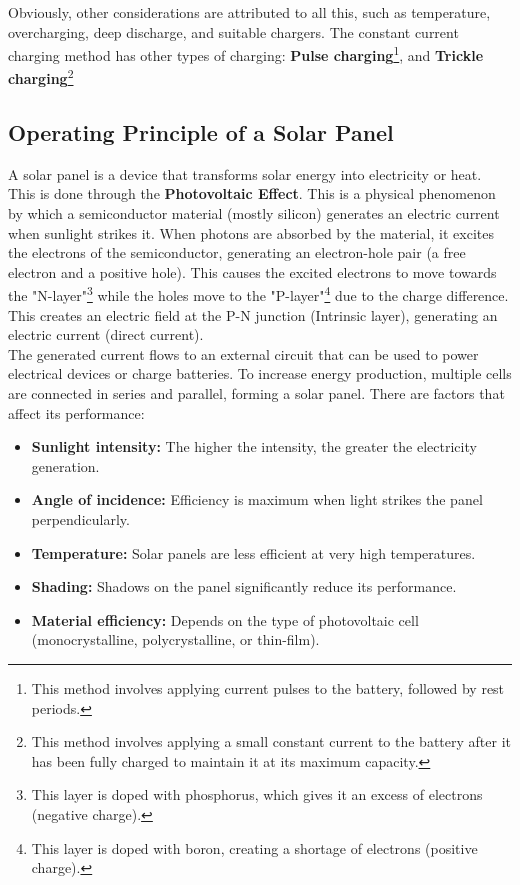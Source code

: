 Obviously, other considerations are attributed to all this, such as temperature, overcharging, deep discharge, and suitable chargers. The constant current charging method has other types of charging: \textbf{Pulse charging}\footnote{This method involves applying current pulses to the battery, followed by rest periods.}, and \textbf{Trickle charging}\footnote{This method involves applying a small constant current to the battery after it has been fully charged to maintain it at its maximum capacity.}

\subsection{Operating Principle of a Solar Panel}

A solar panel is a device that transforms solar energy into electricity or heat. This is done through the \textbf{Photovoltaic Effect}. This is a physical phenomenon by which a semiconductor material (mostly silicon) generates an electric current when sunlight strikes it. When photons are absorbed by the material, it excites the electrons of the semiconductor, generating an electron-hole pair (a free electron and a positive hole). This causes the excited electrons to move towards the "N-layer"\footnote{This layer is doped with phosphorus, which gives it an excess of electrons (negative charge).} while the holes move to the "P-layer"\footnote{This layer is doped with boron, creating a shortage of electrons (positive charge).} due to the charge difference. This creates an electric field at the P-N junction (Intrinsic layer), generating an electric current (direct current).\\

The generated current flows to an external circuit that can be used to power electrical devices or charge batteries. To increase energy production, multiple cells are connected in series and parallel, forming a solar panel. There are factors that affect its performance:

\begin{itemize}
  \item \textbf{Sunlight intensity:} The higher the intensity, the greater the electricity generation.
  \item \textbf{Angle of incidence:} Efficiency is maximum when light strikes the panel perpendicularly.
  \item \textbf{Temperature:} Solar panels are less efficient at very high temperatures.
  \item \textbf{Shading:} Shadows on the panel significantly reduce its performance.
  \item \textbf{Material efficiency:} Depends on the type of photovoltaic cell (monocrystalline, polycrystalline, or thin-film).
\end{itemize}

